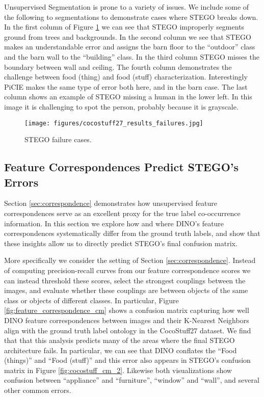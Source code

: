 \documentclass{article} \usepackage{iclr2022_conference,times}
\begin{document}
 Unsupervised Segmentation is prone to a variety of issues. We include some of the following to segmentations to demonstrate cases where STEGO breaks down. In the first column of Figure \ref{fig:failure_cases} we can see that STEGO improperly segments ground from trees and backgrounds. In the second column we see that STEGO makes an understandable error and assigns the barn floor to the ``outdoor'' class and the barn wall to the ``building'' class. In the third column STEGO misses the boundary between wall and ceiling. The fourth column demonstrates the challenge between food (thing) and food (stuff) characterization. Interestingly PiCIE makes the same type of error both here, and in the barn case. The last column shows an example of STEGO missing a human in the lower left. In this image it is challenging to spot the person, probably because it is grayscale.
 
 \begin{figure}[h]
 \centering
 \texttt{[image: figures/cocostuff27\_results\_failures.jpg]}
  \caption{STEGO failure cases. }
\label{fig:failure_cases}
\end{figure}


\newpage

\subsection{Feature Correspondences Predict STEGO's Errors}

Section \ref{sec:correspondence} demonstrates how unsupervised feature correspondences serve as an excellent proxy for the true label co-occurrence information. In this section we explore how and where DINO's feature correspondences systematically differ from the ground truth labels, and show that these insights allow us to directly predict STEGO's final confusion matrix. 

More specifically we consider the setting of Section \ref{sec:correspondence}. Instead of computing precision-recall curves from our feature correspondence scores we can instead threshold these scores, select the strongest couplings between the images, and evaluate whether these couplings are between objects of the same class or objects of different classes. In particular, Figure \ref{fig:feature_correspondence_cm} shows a confusion matrix capturing how well DINO feature correspondences between images and their K-Nearest Neighbors align with the ground truth label ontology in the CocoStuff27 dataset. We find that that this analysis predicts many of the areas where the final STEGO architecture fails. In particular, we can see that DINO conflates the ``Food (things)'' and ``Food (stuff)'' and this error also appears in STEGO's confusion matrix in Figure \ref{fig:cocostuff_cm_2}. Likewise both visualizations show confusion between ``appliance'' and ``furniture'', ``window'' and ``wall'', and several other common errors.
\end{document}
